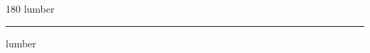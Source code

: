 
\begin{frame}
\begin{center}
\begin{turn}{180}
{\fontsize{2.5cm}{1em}\selectfont lumber}
\end{turn}
\vspace{1em}\par  
\hrule
\vspace{1em}\par  
{\fontsize{2.5cm}{1em}\selectfont lumber}
\end{center}
\end{frame}
